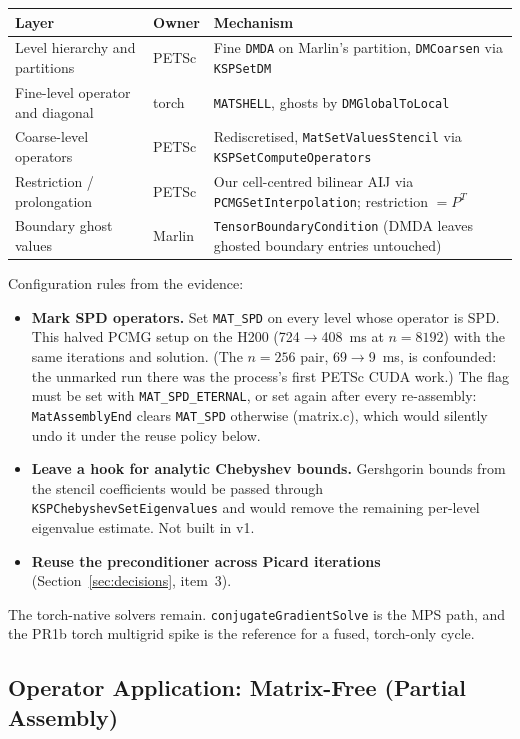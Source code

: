 \documentclass[11pt]{article}
\begin{document}
\begin{longtable}{p{} p{} p{}}
\toprule
Layer & Owner & Mechanism \\
\midrule
\endhead
Level hierarchy and partitions & PETSc & Fine \texttt{DMDA} on Marlin's partition, \texttt{DMCoarsen} via \texttt{KSPSetDM} \\
Fine-level operator and diagonal & torch & \texttt{MATSHELL}, ghosts by \texttt{DMGlobalToLocal} \\
Coarse-level operators & PETSc & Rediscretised, \texttt{MatSetValuesStencil} via \texttt{KSPSetComputeOperators} \\
Restriction / prolongation & PETSc & Our cell-centred bilinear AIJ via \texttt{PCMGSetInterpolation}; restriction $=P^T$ \\
Boundary ghost values & Marlin & \texttt{TensorBoundaryCondition} (DMDA leaves ghosted boundary entries untouched) \\
\bottomrule
\end{longtable}

Configuration rules from the evidence:
\begin{itemize}[leftmargin=*]
\item \textbf{Mark SPD operators.} Set \texttt{MAT\_SPD} on every level
whose operator is SPD. This halved PCMG setup on the H200 (724$\to$408~ms
at $n=8192$) with the same iterations and solution. (The $n=256$ pair,
69$\to$9~ms, is confounded: the unmarked run there was the process's first
PETSc CUDA work.) The flag must be set with \texttt{MAT\_SPD\_ETERNAL}, or
set again after every re-assembly: \texttt{MatAssemblyEnd} clears
\texttt{MAT\_SPD} otherwise (matrix.c), which would silently undo it under
the reuse policy below.
\item \textbf{Leave a hook for analytic Chebyshev bounds.} Gershgorin bounds
from the stencil coefficients would be passed through
\texttt{KSPChebyshevSetEigenvalues} and would remove the remaining per-level
eigenvalue estimate. Not built in v1.
\item \textbf{Reuse the preconditioner across Picard iterations}
(Section~\ref{sec:decisions}, item~3).
\end{itemize}

The torch-native solvers remain. \texttt{conjugateGradientSolve} is the MPS
path, and the PR1b torch multigrid spike is the reference for a fused,
torch-only cycle.

\subsection{Operator Application: Matrix-Free (Partial Assembly)}
\label{sec:partial-assembly}
\end{document}
